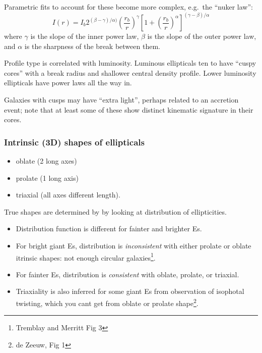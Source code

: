 \documentclass{article}
\begin{document}
Parametric fits to account for these become more complex,
e.g.\ the ``nuker law'':
\[
    I(r) = I_{b}2^{ (\beta-\gamma) / \alpha) }
    \left( \frac{r_{b}}{r} \right) ^{\gamma}
    \left[ 1 + \left( \frac{r_{b}}{r} \right) ^{\alpha} \right]
    ^{ \left( \gamma - \beta \right) / \alpha }
    \]
where $\gamma$ is the slope of the inner power law, $\beta$ is the slope of
the outer power law, and $\alpha$ is the sharpness of the break between
them.

Profile type is correlated with luminosity. Luminous ellipticals ten to
have ``cuspy cores'' with a break radius and shallower central density
profile. Lower luminosity ellipticals have power laws all the way in.

Galaxies with cusps may have ``extra light'', perhaps related to an
accretion event; note that at least some of these show distinct kinematic
signature in their cores.

\subsubsection{Intrinsic (3D) shapes of ellipticals}
\begin{itemize}
    \item oblate (2 long axes)
    \item prolate (1 long axis)
    \item triaxial (all axes different length).
\end{itemize}
True shapes are determined by by looking at distribution of ellipticities.
\begin{itemize}
    \item Distribution function is different for fainter and
        brighter Es.
    \item For bright giant Es, distribution is \emph{inconsistent} with
        either prolate or oblate itrinsic shapes: not enough circular
        galaxies\footnote{Tremblay and Merritt Fig 3}.
    \item For fainter Es, distribution is \emph{consistent} with
        oblate, prolate, or triaxial.
    \item Triaxiality is also inferred for some giant Es from
        observation of isophotal twisting, which you cant get from
        oblate or prolate shape\footnote{de Zeeuw, Fig 1}.
\end{itemize}
\end{document}
